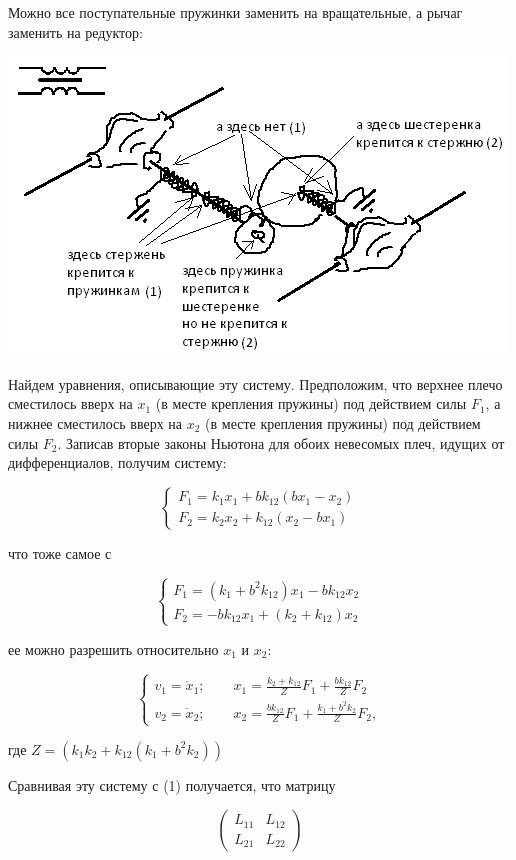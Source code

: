 \documentclass[11pt]{article} %
\begin{document}
Можно все поступательные пружинки заменить на вращательные, а рычаг заменить на редуктор:

\includegraphics{../T_rot.png}

Найдем уравнения, описывающие эту систему.
Предположим, что верхнее плечо сместилось вверх на $x_1$ (в месте крепления пружины) под действием силы $F_1$, а нижнее сместилось вверх на $x_2$ (в месте крепления пружины) под действием силы $F_2$. Записав вторые законы Ньютона для обоих невесомых плеч, идущих от дифференциалов, получим систему:

$$
\begin{cases}
F_1=k_1 x_1+b k_{12}(bx_1-x_2)\\
F_2=k_2 x_2+k_{12}(x_2-bx_1)
\end{cases}
$$

что тоже самое с

$$
\begin{cases}
F_1=(k_1+b^2k_{12})x_1-bk_{12}x_2\\
F_2=-bk_{12}x_1+(k_2+k_{12})x_2
\end{cases}
$$

ее можно разрешить относительно $x_1$ и $x_2$:

$$
\begin{cases}
v_1=\dot x_1; \qquad x_1=\frac{k_2+k_{12}}{Z} F_1+\frac{bk_{12}}{Z}F_2\\
v_2=\dot x_2; \qquad x_2=\frac{bk_{12}}{Z}F_1+\frac{k_1+b^2k_2}{Z}F_2,
\end{cases}
$$

где $Z=(k_1k_2+k_{12}(k_1+b^2k_2))$

Сравнивая эту систему с (1) получается, что матрицу

$$\begin{pmatrix}
L_{11} & L_{12}\\
L_{21} & L_{22}
\end{pmatrix}$$
\end{document}
